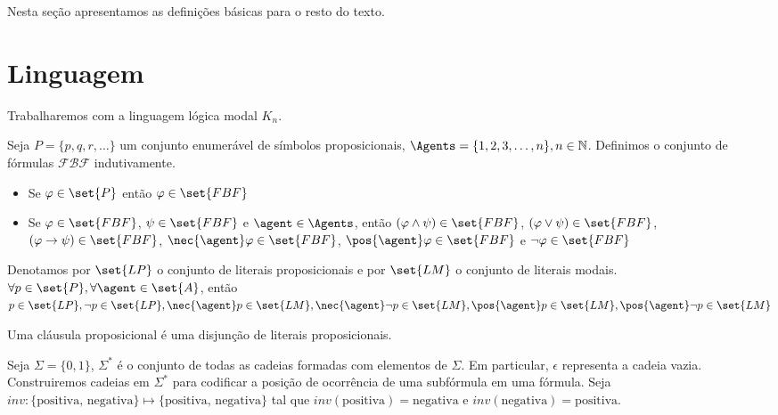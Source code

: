 
Nesta seção apresentamos as definições básicas para o resto do texto.

\section{Linguagem}
Trabalharemos com a linguagem lógica modal $K_n$.

\begin{definition}
	Seja $P = \{p, q, r, \dots\}$ um conjunto enumerável de símbolos proposicionais, $\Agents = \{1, 2, 3, \dots, n\}, n \in \mathbb{N}$. Definimos o conjunto de fórmulas $\mathcal{FBF}$ indutivamente.
	
	\begin{itemize}
		\item Se $\varphi \in \set{P}$ então $\varphi \in \set{FBF}$
		\item Se $\varphi \in \set{FBF}$, $\psi \in \set{FBF}$ e $\agent \in \Agents$, então $(\varphi \land \psi) \in \set{FBF}$, $(\varphi \lor \psi) \in \set{FBF}$, $(\varphi \rightarrow \psi) \in \set{FBF}$, $\nec{\agent} \varphi \in \set{FBF}$, $\pos{\agent} \varphi \in \set{FBF}$ e $\neg\varphi \in \set{FBF}$
	\end{itemize}
\end{definition}

\begin{definition}
	Denotamos por $\set{LP}$ o conjunto de literais proposicionais e por $\set{LM}$ o conjunto de literais modais.
	$\forall p \in \set{P}, \forall \agent \in \set{A}$, então $ p \in \set{LP}, \neg p \in \set{LP}, \nec{\agent} p \in \set{LM}, \nec{\agent} \neg p \in \set{LM}, \pos{\agent} p \in \set{LM}, \pos{\agent} \neg p \in \set{LM}$
\end{definition}

\begin{definition}
	Uma cláusula proposicional é uma disjunção de literais proposicionais.
\end{definition}

Seja $\Sigma = \{0, 1\}$, $\Sigma^*$ é o conjunto de todas as cadeias formadas com elementos de $\Sigma$. Em particular, $\epsilon$ representa a cadeia vazia. Construiremos cadeias em $\Sigma^*$ para codificar a posição de ocorrência de uma subfórmula em uma fórmula. Seja $inv \colon \{\text{positiva, negativa}\} \mapsto \{\text{positiva, negativa}\}$ tal que $inv(\text{positiva}) = \text{negativa}$ e $inv(\text{negativa}) = \text{positiva}$.

